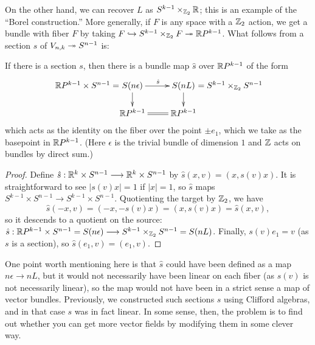 On the other hand, we can recover $L$ as $S^{k-1} \times_{\mathbb{Z}_2} \mathbb{R}$; this is an example of the ``Borel construction.'' %
More generally, if $F$ is any space with a $\mathbb{Z}_2$ action, we get a bundle with fiber $F$ by taking $F \hookrightarrow S^{k-1} \times_{\mathbb{Z}_2} F \twoheadrightarrow \mathbb{R} P^{k-1}$.  What follows from a section $s$ of $V_{n, k} \twoheadrightarrow S^{n-1}$ is:
\begin{lem}
If there is a section $s$, then there is a bundle map $\hat s$ over $\mathbb{R} P^{k-1}$ of the form
\[\xymatrix@R=.6cm{
\makebox[0cm][r]{$\RP^{k-1} \times S^{n-1}=$\ }S(n \epsilon)\ar[r]^{\hat s}\ar[d]&
S(nL)\makebox[0cm][l]{\ $=S^{k-1} \times_{\Z_2} S^{n-1}$}\ar[d]\\
\RP^{k-1}\ar@{=}[r]&\RP^{k-1}
}\]
which acts as the identity on the fiber over the point $\pm e_1$, which we take as the basepoint in $\mathbb{R} P^{k-1}$.
(Here $\epsilon$ is the trivial bundle of dimension $1$ and $\mathbb{Z}$ acts on bundles by direct sum.)
\end{lem}
\begin{proof}
Define $\hat s: \mathbb{R}^k \times S^{n-1} \longrightarrow \mathbb{R}^k \times S^{n-1}$ by $\hat s(x, v) = (x, s(v) x)$.  It is straightforward to see $|s(v) x| = 1$ if $|x| = 1$, so $\hat s$ maps $S^{k-1} \times S^{n-1} \to S^{k-1} \times S^{n-1}$.  Quotienting the target by $\mathbb{Z}_2$, we have \[\hat s(-x, v) = (-x, -s(v)x) = (x, s(v) x) = \hat{s}(x, v),\] so it descends to a quotient on the source: $\hat{s}: \mathbb{R} P^{k-1} \times S^{n-1} = S(n \epsilon) \longrightarrow S^{k-1} \times_{\mathbb{Z}_2} S^{n-1} = S(nL)$.  Finally, $s(v)e_1 = v$ (as $s$ is a section), so $\hat{s}(e_1, v) = (e_1, v)$.
\end{proof}
One point worth mentioning here is that $\hat s$ could have been defined as a map $n \epsilon \to n L$, but it would not necessarily have been linear on each fiber (as $s(v)$ is not necessarily linear), so the map would not have been in a strict sense a map of vector bundles.  Previously, we constructed such sections $s$ using Clifford algebras, and in that case $s$ was in fact linear.  In some sense, then, the problem is to find out whether you can get more vector fields by modifying them in some clever way.

